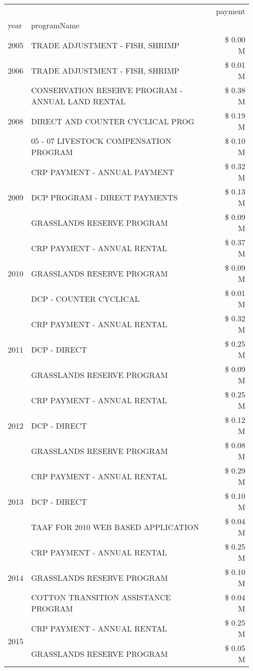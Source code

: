 \begin{tabular}{llr}
\toprule
 &  & payment \\
year & programName &  \\
\midrule
2005 & TRADE ADJUSTMENT - FISH, SHRIMP & \$ 0.00 M \\
\cline{1-3}
2006 & TRADE ADJUSTMENT - FISH, SHRIMP & \$ 0.01 M \\
\cline{1-3}
\multirow[t]{3}{*}{2008} & CONSERVATION RESERVE PROGRAM - ANNUAL LAND RENTAL & \$ 0.38 M \\
 & DIRECT AND COUNTER CYCLICAL PROG & \$ 0.19 M \\
 & 05 - 07 LIVESTOCK COMPENSATION PROGRAM & \$ 0.10 M \\
\cline{1-3}
\multirow[t]{3}{*}{2009} & CRP PAYMENT - ANNUAL PAYMENT & \$ 0.32 M \\
 & DCP PROGRAM - DIRECT PAYMENTS & \$ 0.13 M \\
 & GRASSLANDS RESERVE PROGRAM & \$ 0.09 M \\
\cline{1-3}
\multirow[t]{3}{*}{2010} & CRP PAYMENT - ANNUAL RENTAL & \$ 0.37 M \\
 & GRASSLANDS RESERVE PROGRAM & \$ 0.09 M \\
 & DCP - COUNTER CYCLICAL & \$ 0.01 M \\
\cline{1-3}
\multirow[t]{3}{*}{2011} & CRP PAYMENT - ANNUAL RENTAL & \$ 0.32 M \\
 & DCP - DIRECT & \$ 0.25 M \\
 & GRASSLANDS RESERVE PROGRAM & \$ 0.09 M \\
\cline{1-3}
\multirow[t]{3}{*}{2012} & CRP PAYMENT - ANNUAL RENTAL & \$ 0.25 M \\
 & DCP - DIRECT & \$ 0.12 M \\
 & GRASSLANDS RESERVE PROGRAM & \$ 0.08 M \\
\cline{1-3}
\multirow[t]{3}{*}{2013} & CRP PAYMENT - ANNUAL RENTAL & \$ 0.29 M \\
 & DCP - DIRECT & \$ 0.10 M \\
 & TAAF FOR 2010 WEB BASED APPLICATION & \$ 0.04 M \\
\cline{1-3}
\multirow[t]{3}{*}{2014} & CRP PAYMENT - ANNUAL RENTAL & \$ 0.25 M \\
 & GRASSLANDS RESERVE PROGRAM & \$ 0.10 M \\
 & COTTON TRANSITION ASSISTANCE PROGRAM & \$ 0.04 M \\
\cline{1-3}
\multirow[t]{3}{*}{2015} & CRP PAYMENT - ANNUAL RENTAL & \$ 0.25 M \\
 & GRASSLANDS RESERVE PROGRAM & \$ 0.05 M \\

\end{tabular}
